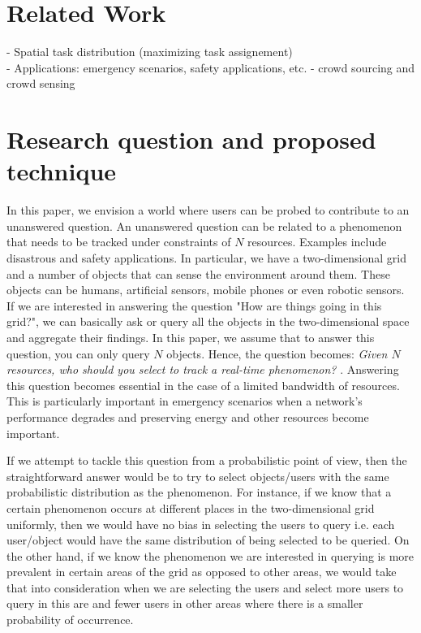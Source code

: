 \documentclass{acm_proc_article-sp}
\begin{document}
\section{Related Work}
- Spatial task distribution (maximizing task assignement)\\
- Applications: emergency scenarios, safety applications, etc. 
- crowd sourcing and crowd sensing

\section{Research question and proposed technique}
In this paper, we envision a world where users can be probed to contribute to an unanswered question. An unanswered question can be related to a phenomenon that needs to be tracked under  constraints of $N$ resources. Examples include disastrous and safety applications. In particular, we have a two-dimensional grid and a number of objects that can sense the environment around them. These objects can be humans, artificial sensors, mobile phones or even robotic sensors. If we are interested in answering the question "How are things going in this grid?", we can basically ask or query all the objects in the two-dimensional space and aggregate their findings. In this paper, we assume that to answer this question, you can only query $N$ objects. Hence, the question becomes: \textit{Given $N$ resources, who should you select to track a real-time phenomenon? }.  Answering this question becomes essential in the case of a limited bandwidth of resources. This is particularly important in emergency scenarios when a network's performance degrades and preserving energy and other resources become important.\par
If we attempt to tackle this question from a probabilistic point of view, then the straightforward answer would be to try to select objects/users with the same probabilistic distribution as the phenomenon. For instance, if we know that a certain phenomenon occurs at different places in the two-dimensional grid uniformly, then we would have no bias in selecting the users to query i.e. each user/object would have the same distribution of being selected to be queried. On the other hand, if we know the phenomenon we are interested in querying is more prevalent in certain areas of the grid as opposed to other areas, we would take that into consideration when we are selecting the users and select more users to query in this are and fewer users in other areas where there is a smaller probability of occurrence.\par
\end{document}
